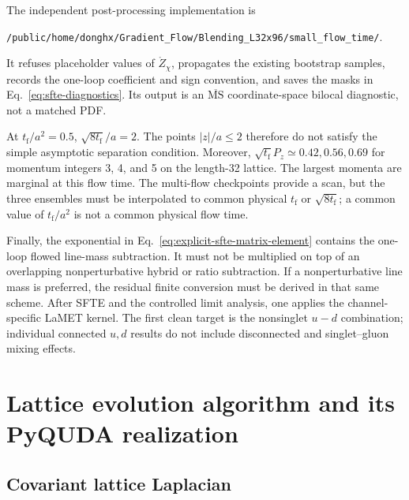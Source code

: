 \documentclass[11pt]{article}
\numberwithin{equation}{section}
\newcommand{\MSbar}{\overline{\mathrm{MS}}}
\newcommand{\tf}{t_{\mathrm f}}
\begin{document}
The independent post-processing implementation is
\begin{center}
  \nolinkurl{/public/home/donghx/Gradient_Flow/Blending_L32x96/small_flow_time/}.
\end{center}
It refuses placeholder values of \(\mathring Z_\chi\), propagates the existing
bootstrap samples, records the one-loop coefficient and sign convention, and
saves the masks in Eq.~\eqref{eq:sfte-diagnostics}.  Its output is an
\(\MSbar\) coordinate-space bilocal diagnostic, not a matched PDF.

At \(\tf/a^2=0.5\), \(\sqrt{8\tf}/a=2\).  The points \(|z|/a\le2\) therefore
do not satisfy the simple asymptotic separation condition.  Moreover,
\(\sqrt{\tf}P_z\simeq0.42,0.56,0.69\) for momentum integers 3, 4, and 5 on
the length-32 lattice.  The largest momenta are marginal at this flow time.
The multi-flow checkpoints provide a scan, but the three ensembles must be
interpolated to common physical \(\tf\) or \(\sqrt{8\tf}\); a common value of
\(\tf/a^2\) is not a common physical flow time.

Finally, the exponential in Eq.~\eqref{eq:explicit-sfte-matrix-element}
contains the one-loop flowed line-mass subtraction.  It must not be multiplied
on top of an overlapping nonperturbative hybrid or ratio subtraction.  If a
nonperturbative line mass is preferred, the residual finite conversion must be
derived in that same scheme.  After SFTE and the controlled limit analysis,
one applies the channel-specific LaMET kernel.  The first clean target is the
nonsinglet \(u-d\) combination; individual connected \(u,d\) results do not
include disconnected and singlet--gluon mixing effects.

\section{Lattice evolution algorithm and its PyQUDA realization}
\label{sec:pyquda-gflow}

\subsection{Covariant lattice Laplacian}
\end{document}
